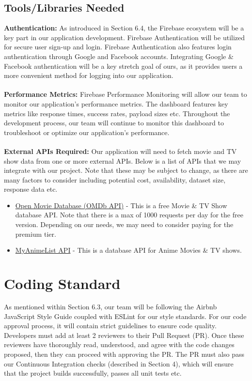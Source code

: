\documentclass{article}
\begin{document}
\subsection{Tools/Libraries Needed}
\textbf{Authentication:}
As introduced in Section 6.4, the Firebase ecosystem will be a key part in our application development. Firebase Authentication will be utilized for secure user sign-up and login. Firebase Authentication also features login authentication through Google and Facebook accounts. Integrating Google \& Facebook authentication will be a key stretch goal of ours, as it provides users a more convenient method for logging into our application. 
\\ \\
\noindent \textbf{Performance Metrics:} 
Firebase Performance Monitoring will allow our team to monitor our application's performance metrics. The dashboard features key metrics like response times, success rates, payload sizes etc. Throughout the development process, our team will continue to monitor this dashboard to troubleshoot or optimize our application's performance. 
\\ \\
\noindent \textbf{External APIs Required:} 
Our application will need to fetch movie and TV show data from one or more external APIs. Below is a list of APIs that we may integrate with our project. Note that these may be subject to change, as there are many factors to consider including potential cost, availability, dataset size, response data etc.
\begin{itemize}
	\item \href{https://www.omdbapi.com/}{Open Movie Database (OMDb API)} - This is a free Movie \& TV Show database API. Note that there is a max of 1000 requests per day for the free version. Depending on our needs, we may need to consider paying for the premium tier.
	\item \href{https://myanimelist.net/apiconfig/references/api/v2}{MyAnimeList API} - This is a database API for Anime Movies \& TV shows.  
\end{itemize}

\section{Coding Standard}
As mentioned within Section 6.3, our team will be following the Airbnb JavaScript Style Guide coupled with ESLint for our style standards. For our code approval process, it will contain strict guidelines to ensure code quality. Developers must add at least 2 reviewers to their Pull Request (PR). Once these reviewers have thoroughly read, understood, and agree with the code changes proposed, then they can proceed with approving the PR. The PR must also pass our Continuous Integration checks (described in Section 4), which will ensure that the project builds successfully, passes all unit tests etc.
\end{document}

